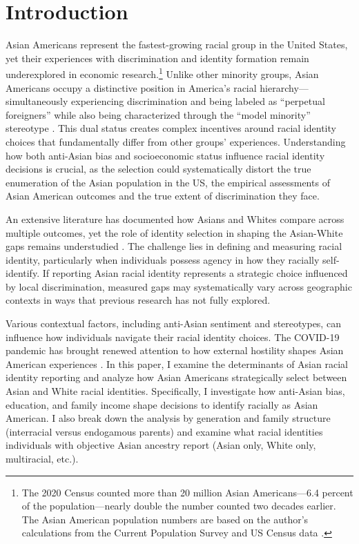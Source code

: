 
\section{Introduction}\label{sec:intro}

Asian Americans represent the fastest-growing racial group in the United States, yet their experiences with discrimination and identity formation remain underexplored in economic research.\footnote{The 2020 Census counted more than 20 million Asian Americans---6.4 percent of the population—nearly double the number counted two decades earlier. The Asian American population numbers are based on the author's calculations from the Current Population Survey and US Census data \autocite{floodsarahIntegratedPublicUse2021a}.} Unlike other minority groups, Asian Americans occupy a distinctive position in America's racial hierarchy---simultaneously experiencing discrimination and being labeled as ``perpetual foreigners'' while also being characterized through the ``model minority'' stereotype \autocite{foukaImmigrantsAmericansRace2022}. This dual status creates complex incentives around racial identity choices that fundamentally differ from other groups' experiences. Understanding how both anti-Asian bias and socioeconomic status influence racial identity decisions is crucial, as the selection could systematically distort the true enumeration of the Asian population in the US, the empirical assessments of Asian American outcomes and the true extent of discrimination they face.

An extensive literature has documented how Asians and Whites compare across multiple outcomes, yet the role of identity selection in shaping the Asian-White gaps remains understudied \autocite{chiswick1983analysis, duleep2012economic, hilger2016upward, arabsheibani2010asian}. The challenge lies in defining and measuring racial identity, particularly when individuals possess agency in how they racially self-identify. If reporting Asian racial identity represents a strategic choice influenced by local discrimination, measured gaps may systematically vary across geographic contexts in ways that previous research has not fully explored.

Various contextual factors, including anti-Asian sentiment and stereotypes, can influence how individuals navigate their racial identity choices. The COVID-19 pandemic has brought renewed attention to how external hostility shapes Asian American experiences \autocite{gover2020anti}. In this paper, I examine the determinants of Asian racial identity reporting and analyze how Asian Americans strategically select between Asian and White racial identities. Specifically, I investigate how anti-Asian bias, education, and family income shape decisions to identify racially as Asian American. I also break down the analysis by generation and family structure (interracial versus endogamous parents) and examine what racial identities individuals with objective Asian ancestry report (Asian only, White only, multiracial, etc.).


